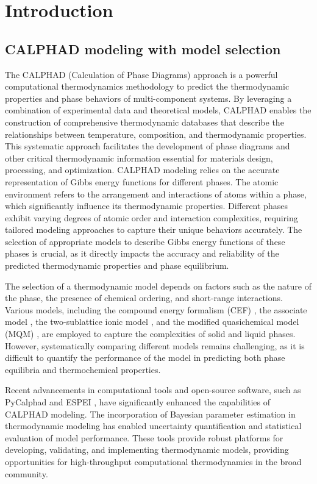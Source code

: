 \chapter{Introduction} \label{sec:Introduction}

\section{CALPHAD modeling with model selection} \label{intro:sec:calphad}
The CALPHAD (Calculation of Phase Diagrams) approach \cite{liu2020computational, lukas2007computational} is a powerful computational thermodynamics methodology to predict the thermodynamic properties and phase behaviors of multi-component systems. By leveraging a combination of experimental data and theoretical models, CALPHAD enables the construction of comprehensive thermodynamic databases that describe the relationships between temperature, composition, and thermodynamic properties. This systematic approach facilitates the development of phase diagrams and other critical thermodynamic information essential for materials design, processing, and optimization. CALPHAD modeling relies on the accurate representation of Gibbs energy functions for different phases. The atomic environment refers to the arrangement and interactions of atoms within a phase, which significantly influence its thermodynamic properties. Different phases exhibit varying degrees of atomic order and interaction complexities, requiring tailored modeling approaches to capture their unique behaviors accurately. The selection of appropriate models to describe Gibbs energy functions of these phases is crucial, as it directly impacts the accuracy and reliability of the predicted thermodynamic properties and phase equilibrium. 

The selection of a thermodynamic model depends on factors such as the nature of the phase, the presence of chemical ordering, and short-range interactions. Various models, including the compound energy formalism (CEF) \cite{hillert1970regular}, the associate model \cite{sommer1982association}, the two-sublattice ionic model \cite{hillert1985two}, and the modified quasichemical model (MQM) \cite{pelton2018phase}, are employed to capture the complexities of solid and liquid phases. However, systematically comparing different models remains challenging, as it is difficult to quantify the performance of the model in predicting both phase equilibria and thermochemical properties.

Recent advancements in computational tools and open-source software, such as PyCalphad \cite{otis2017pycalphad} and ESPEI \cite{bocklund2019espei}, have significantly enhanced the capabilities of CALPHAD modeling. The incorporation of Bayesian parameter estimation in thermodynamic modeling has enabled uncertainty quantification and statistical evaluation of model performance. These tools provide robust platforms for developing, validating, and implementing thermodynamic models, providing opportunities for high-throughput computational thermodynamics in the broad community.

